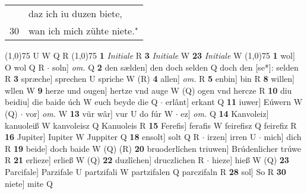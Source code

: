 \documentclass[8pt,a4paper,notitlepage]{article}
\begin{document}
\begin{table}[ht]
\begin{minipage}[t]{0.5\linewidth}
\begin{tabular}{rl}
 & daz ich iu duzen biete,\\ 
30 & wan ich mich zühte niete."\\ 
\end{tabular}
\scriptsize
\line(1,0){75} \newline
U W Q R \newline
\line(1,0){75} \newline
\textbf{1} \textit{Initiale} R  \textbf{3} \textit{Initiale} W  \textbf{23} \textit{Initiale} W  \newline
\line(1,0){75} \newline
\textbf{1} wol] O wol Q R  $\cdot$ soln] \textit{om.} Q \textbf{2} den sælden] den doch selden Q doch den [se*]: selden R \textbf{3} spræche] sprechen U spriche W (R) \textbf{4} allen] \textit{om.} R \textbf{5} enbin] bin R \textbf{8} willen] wllen W \textbf{9} herze und ougen] hertze vnd auge W (Q) ogen vnd hercze R \textbf{10} diu beidiu] die baide úch W euch beyde die Q  $\cdot$ erlânt] erkant Q \textbf{11} iuwer] Eúwern W (Q)  $\cdot$ vor] \textit{om.} W \textbf{13} vür wâr] vur U do fúr W  $\cdot$ ez] \textit{om.} Q \textbf{14} Kanvoleiz] kanuoleiß W kanvoleisz Q Kanuoleis R \textbf{15} Ferefis] ferafis W feirefisz Q feirefiz R \textbf{16} Jupiter] Iupiter W Juppiter Q \textbf{18} ensolt] solt Q R  $\cdot$ irzen] irren U  $\cdot$ mich] dich R \textbf{19} beide] doch baide W (Q) (R) \textbf{20} bruoderlîchen triuwen] Brúdenlicher trúwe R \textbf{21} erlieze] erließ W (Q) \textbf{22} duzlîchen] druczlichen R  $\cdot$ hieze] hieß W (Q) \textbf{23} Parcifale] Parzifale U partzifali W partzifalen Q parczifaln R \textbf{28} sol] So R \textbf{30} niete] mite Q \newline
\end{minipage}
\end{table}
\end{document}

